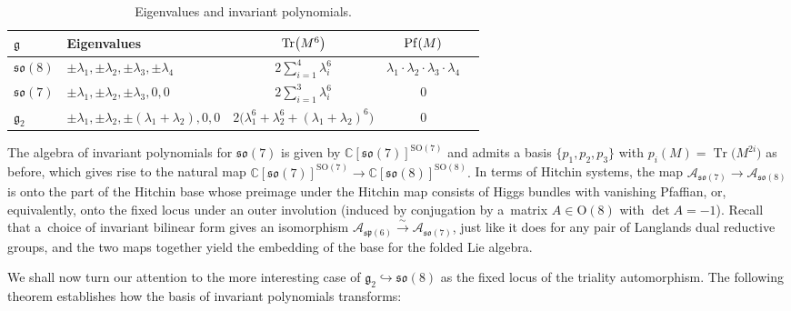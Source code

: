 \documentclass[10pt,a4paper]{amsart}
\numberwithin{equation}{section}
\def\C{{\mathbb C}}
\newcommand{\SO}{{\mathrm{SO}}}
\newcommand{\Tr}{\operatorname{Tr}}
\begin{document}
 \begin{table}[h]\centering\renewcommand{\arraystretch}{1.3}
\begin{tabular}{llccc}
 $\mathfrak{g}$ & Eigenvalues & ${\rm Tr}\big(M^6\big)$ & ${\rm Pf}(M)$ \\
\hline
$\mathfrak{so}(8)$ & $\pm \lambda_1,\pm \lambda_2,\pm \lambda_3,\pm \lambda_4$ &$2\sum_{i=1}^4\lambda_i^6$	& $\lambda_1\cdot \lambda_2\cdot\lambda_3\cdot\lambda_4$ \\
$\mathfrak{so}(7)$ & $\pm \lambda_1,\pm \lambda_2,\pm \lambda_3,0,0$ &$2\sum_{i=1}^3\lambda_i^6$ 	& 0 \\
$\mathfrak{g}_{2}$ & $\pm \lambda_1,\pm \lambda_2,\pm (\lambda_1+\lambda_2),0,0$ & $ 2\big(\lambda_1^6+\lambda_2^6+(\lambda_1+\lambda_2)^6\big)$ 	& 0
 \end{tabular}
\caption{Eigenvalues and invariant polynomials.} \label{table22}
\end{table}

The algebra of invariant polynomials for $\mathfrak{so}(7)$ is given by $\C [\mathfrak{so}(7)]^{\SO(7)}$ and admits a basis $\{p_1, p_2, p_3 \}$ with $p_i (M) = \Tr\big(M^{2i}\big) $ as before, which gives rise to the natural map
$\C [\mathfrak{so}(7)]^{\SO(7)} \rightarrow \C [\mathfrak{so}(8)]^{\SO(8)}.$
In terms of Hitchin systems, the map $
 \mathcal{A}_{\mathfrak{so}(7)} \rightarrow \mathcal{A}_{\mathfrak{so}(8)}$
is onto the part of the Hitchin base whose preimage under the Hitchin map consists of Higgs bundles with vanishing Pfaffian, or, equivalently, onto the fixed locus under an outer involution (induced by conjugation by a~matrix $A \in \mathrm{O}(8)$ with $\det A = -1$). Recall that a~choice of invariant bilinear form gives an isomorphism $\mathcal{A}_{\mathfrak{sp}(6)} \xrightarrow{\sim} \mathcal{A}_{\mathfrak{so}(7)}$, just like it does for any pair of Langlands dual reductive groups, and the two maps together yield the embedding of the base for the folded Lie algebra.

We shall now turn our attention to the more interesting case of $\mathfrak{g}_2 \hookrightarrow \mathfrak{so}(8)$ as the fixed locus of the triality automorphism. The following theorem establishes how the basis of invariant polynomials transforms:
\end{document}
